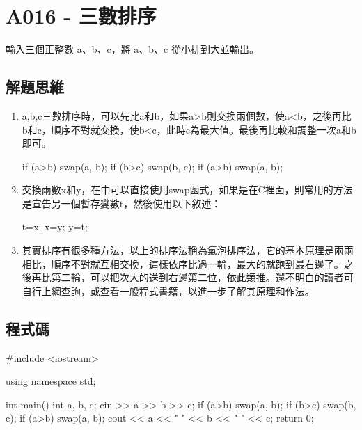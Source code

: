 \section{A016 - 三數排序}
輸入三個正整數 a、b、c，將 a、b、c 從小排到大並輸出。
\subsection{解題思維}
\begin{enumerate}
\item a,b,c三數排序時，可以先比a和b，如果a>b則交換兩個數，使a<b，之後再比b和c，順序不對就交換，使b<c，此時c為最大值。最後再比較和調整一次a和b即可。
	\begin{inside}
	if (a>b) swap(a, b);
	if (b>c) swap(b, c);
	if (a>b) swap(a, b);
	\end{inside}
\item 交換兩數x和y，在\cc{}中可以直接使用swap函式，如果是在C裡面，則常用的方法是宣告另一個暫存變數t，然後使用以下敘述：
	\begin{inside}
		t=x; x=y; y=t;
	\end{inside}
\item 其實排序有很多種方法，以上的排序法稱為氣泡排序法，它的基本原理是兩兩相比，順序不對就互相交換，這樣依序比過一輪，最大的就跑到最右邊了。之後再比第二輪，可以把次大的送到右邊第二位，依此類推。還不明白的讀者可自行上網查詢，或查看一般程式書籍，以進一步了解其原理和作法。
\end{enumerate}

\subsection{程式碼}
\begin{cppcode}
	#include <iostream>

	using namespace std;
	
	int main()
	{
		int a, b, c;
		cin >> a >> b >> c;
		if (a>b) swap(a, b);
		if (b>c) swap(b, c);
		if (a>b) swap(a, b);
		cout << a << " " << b << " " << c;
		return 0;
	}
\end{cppcode}


